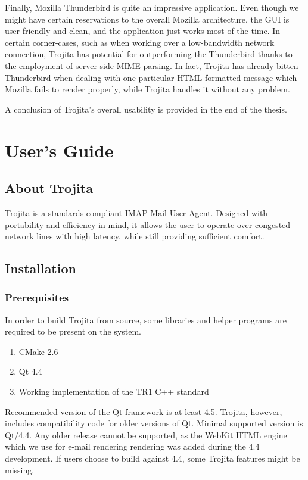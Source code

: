 \documentclass[12pt,notitlepage]{report}
\newcommand{\trojita}{Trojita\xspace}
\begin{document}
Finally, Mozilla Thunderbird is quite an impressive application.  Even though we
might have certain reservations to the overall Mozilla architecture, the GUI is
user friendly and clean, and the application just works most of the time.  In
certain corner-cases, such as when working over a low-bandwidth network
connection, \trojita has potential for outperforming the Thunderbird thanks to
the employment of server-side MIME parsing.  In fact, \trojita has already
bitten Thunderbird when dealing with one particular HTML-formatted message which
Mozilla fails to render properly, while \trojita handles it without any problem.

A conclusion of \trojita's overall usability is provided in the end of the
thesis.

\chapter{User's Guide}
\label{users-guide}

\section{About Trojita}

\trojita is a standards-compliant IMAP Mail User Agent. Designed with portability
and efficiency in mind, it allows the user to operate over congested network
lines with high latency, while still providing sufficient comfort.

\section{Installation}

\subsection{Prerequisites}

In order to build \trojita from source, some libraries and helper programs are
required to be present on the system.

\begin{enumerate}
    \item{CMake 2.6}
    \item{Qt 4.4}
    \item{Working implementation of the TR1 C++ standard}
\end{enumerate}

Recommended version of the Qt framework \cite{qt} is at least 4.5. \trojita,
however, includes compatibility code for older versions of Qt. Minimal supported
version is Qt/4.4. Any older release cannot be supported, as the WebKit HTML
engine which we use for e-mail rendering rendering was added during the 4.4
development. If users choose to build against 4.4, some \trojita features might
be missing.
\end{document}

